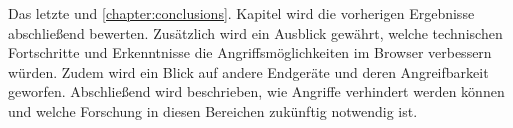 \par \medskip  

Das letzte und \ref{chapter:conclusions}. Kapitel wird die vorherigen Ergebnisse abschließend bewerten.
Zusätzlich wird ein Ausblick gewährt, welche technischen Fortschritte und Erkenntnisse die Angriffsmöglichkeiten im Browser verbessern würden.
Zudem wird ein Blick auf andere Endgeräte und deren Angreifbarkeit geworfen.
Abschließend wird beschrieben, wie Angriffe verhindert werden können und welche Forschung in diesen Bereichen zukünftig notwendig ist.





